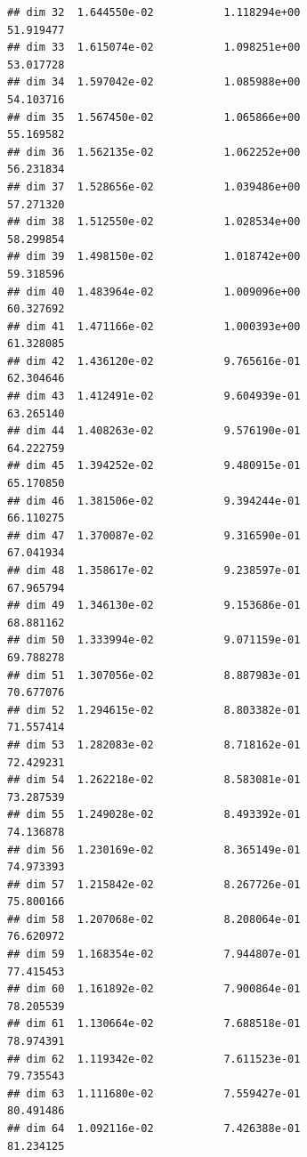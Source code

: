 \documentclass[
]{book}
\begin{document}
\begin{verbatim}
## dim 32  1.644550e-02           1.118294e+00                         51.919477
## dim 33  1.615074e-02           1.098251e+00                         53.017728
## dim 34  1.597042e-02           1.085988e+00                         54.103716
## dim 35  1.567450e-02           1.065866e+00                         55.169582
## dim 36  1.562135e-02           1.062252e+00                         56.231834
## dim 37  1.528656e-02           1.039486e+00                         57.271320
## dim 38  1.512550e-02           1.028534e+00                         58.299854
## dim 39  1.498150e-02           1.018742e+00                         59.318596
## dim 40  1.483964e-02           1.009096e+00                         60.327692
## dim 41  1.471166e-02           1.000393e+00                         61.328085
## dim 42  1.436120e-02           9.765616e-01                         62.304646
## dim 43  1.412491e-02           9.604939e-01                         63.265140
## dim 44  1.408263e-02           9.576190e-01                         64.222759
## dim 45  1.394252e-02           9.480915e-01                         65.170850
## dim 46  1.381506e-02           9.394244e-01                         66.110275
## dim 47  1.370087e-02           9.316590e-01                         67.041934
## dim 48  1.358617e-02           9.238597e-01                         67.965794
## dim 49  1.346130e-02           9.153686e-01                         68.881162
## dim 50  1.333994e-02           9.071159e-01                         69.788278
## dim 51  1.307056e-02           8.887983e-01                         70.677076
## dim 52  1.294615e-02           8.803382e-01                         71.557414
## dim 53  1.282083e-02           8.718162e-01                         72.429231
## dim 54  1.262218e-02           8.583081e-01                         73.287539
## dim 55  1.249028e-02           8.493392e-01                         74.136878
## dim 56  1.230169e-02           8.365149e-01                         74.973393
## dim 57  1.215842e-02           8.267726e-01                         75.800166
## dim 58  1.207068e-02           8.208064e-01                         76.620972
## dim 59  1.168354e-02           7.944807e-01                         77.415453
## dim 60  1.161892e-02           7.900864e-01                         78.205539
## dim 61  1.130664e-02           7.688518e-01                         78.974391
## dim 62  1.119342e-02           7.611523e-01                         79.735543
## dim 63  1.111680e-02           7.559427e-01                         80.491486
## dim 64  1.092116e-02           7.426388e-01                         81.234125

\end{verbatim}
\end{document}
